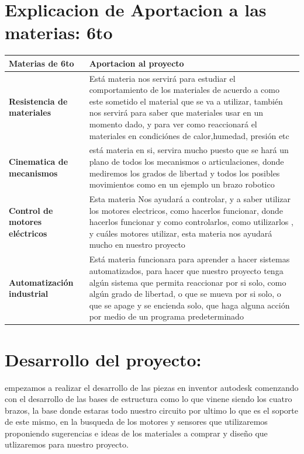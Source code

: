 \documentclass[11pt,a4paper]{article}
\begin{document}
\newpage

\section{Explicacion de Aportacion a las materias: 6to}

\begin{tabular}{|p{5.5cm}|p{7cm}|}
\hline 
\textbf{Materias de 6to} & \textbf{Aportacion al proyecto} \\ \hline
\textbf{Resistencia de materiales} & Está materia nos servirá para estudiar el comportamiento de los materiales de acuerdo a como este sometido el material que se va a utilizar, también nos servirá para saber que materiales usar en un momento dado, y para ver como reaccionará el materiales en condiciónes de calor,humedad, presión etc
 \\ \hline
\textbf{Cinematica de mecanismos} & está materia en si, servira mucho puesto que se hará un plano de todos los mecanismos o articulaciones, donde mediremos los grados de libertad y todos los posibles movimientos como en un ejemplo un brazo robotico  \\ \hline
\textbf{Control de motores eléctricos} & Esta materia Nos ayudará a controlar, y a saber utilizar los motores electricos, como hacerlos funcionar, donde hacerlos funcionar y como controlarlos, como utilizarlos , y cuáles motores utilizar, esta materia nos ayudará mucho en nuestro proyecto \\ \hline
\textbf{Automatización industrial } & Está materia funcionara para aprender a hacer sistemas automatizados, para hacer que nuestro proyecto tenga algún sistema que permita reaccionar por si solo, como algún grado de libertad,  o que se mueva por si solo, o que se apage y se encienda solo, que haga alguna acción por medio de un programa predeterminado  \\ \hline

\end{tabular}

\section{Desarrollo del proyecto:}

empezamos a realizar el desarrollo de las piezas en inventor autodesk comenzando con el desarrollo de las bases de estructura como lo que vinene siendo los cuatro brazos, la base donde estaras todo nuestro circuito por ultimo lo que es el soporte de este mismo, en la busqueda de los motores  y sensores que utilizaremos proponiendo sugerencias e ideas de los materiales a comprar y diseño que utlizaremos para nuestro proyecto.
\end{document}
